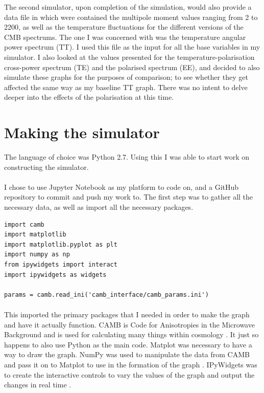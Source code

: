 \documentclass[twoside, fontsize=12pt,
     bibliography=totoc, %
     listof=totoc, %
     index=totoc, %
     onehalfspacing %
]{_MScDiss2017_cls}
\begin{document}
The second simulator, upon completion of the simulation, would also provide a data file in which were contained the multipole moment values ranging from 2 to 2200, as well as the temperature fluctuations for the different versions of the CMB spectrums. The one I was concerned with was the temperature angular power spectrum (TT). I used this file as the input for all the base variables in my simulator. I also looked at the values presented  for the temperature-polarisation cross-power spectrum (TE) and the polarised spectrum (EE), and decided to also simulate these graphs for the purposes of comparison; to see whether they get affected the same way as my baseline TT graph. There was no intent to delve deeper into the effects of the polarisation at this time.

\section{Making the simulator}

The language of choice was Python 2.7. Using this I was able to start work on constructing the simulator.

\paragraph{}

I chose to use Jupyter Notebook \cite{JupyterNotebook} as my platform to code on, and a GitHub repository \cite{Github} to commit and push my work to. The first step was to gather all the necessary data, as well as import all the necessary packages. 

\begin{lstfloat}
\begin{lstlisting}[caption={Setting up}, captionpos=b]
import camb
import matplotlib
import matplotlib.pyplot as plt
import numpy as np
from ipywidgets import interact
import ipywidgets as widgets

params = camb.read_ini('camb_interface/camb_params.ini')
\end{lstlisting}
\end{lstfloat}

\paragraph{}
This imported the primary packages that I needed in order to make the graph and have it actually function. CAMB is Code for Anisotropies in the Microwave Background and is used for calculating many things within cosmology \cite{PythonCAMB}. It just so happens to also use Python as the main code. Matplot was necessary to have a way to draw the graph. NumPy was used to manipulate the data from CAMB and pass it on to Matplot to use in the formation of the graph \cite{numpy}. IPyWidgets was to create the interactive controls to vary the values of the graph and output the changes in real time \cite{widgets}.
\end{document}
